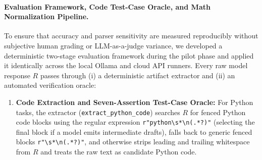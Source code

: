 \documentclass[a4paper,fleqn]{cas-sc}
\providecommand{\tightlist}{%
  \setlength{\itemsep}{0pt}\setlength{\parskip}{0pt}}
\begin{document}
\paragraph{Evaluation Framework, Code Test-Case Oracle, and Math Normalization Pipeline.}
To ensure that accuracy and parser sensitivity are measured reproducibly without subjective human grading or LLM-as-a-judge variance, we developed a deterministic two-stage evaluation framework during the pilot phase and applied it identically across the local Ollama and cloud API runners. Every raw model response $R$ passes through (i) a deterministic artifact extractor and (ii) an automated verification oracle:
\begin{enumerate}
\tightlist
\item \textbf{Code Extraction and Seven-Assertion Test-Case Oracle:}
For Python tasks, the extractor (\texttt{extract\_python\_code}) searches $R$ for fenced Python code blocks using the regular expression \texttt{r"\textasciigrave\textasciigrave\textasciigrave python\textbackslash s*\textbackslash n(.*?)\textasciigrave\textasciigrave\textasciigrave"} (selecting the final block if a model emits intermediate drafts), falls back to generic fenced blocks \texttt{r"\textasciigrave\textasciigrave\textasciigrave\textbackslash s*\textbackslash n(.*?)\textasciigrave\textasciigrave\textasciigrave"}, and otherwise strips leading and trailing whitespace from $R$ and treats the raw text as candidate Python code.


\end{enumerate}
\end{document}
